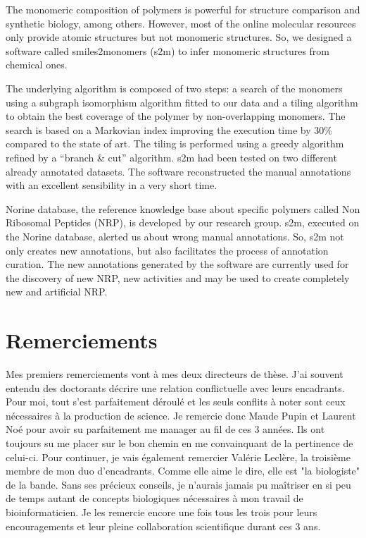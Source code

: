 \documentclass[12pt]{LHSV_thesis}
\begin{document}
The monomeric composition of polymers is powerful for structure comparison and synthetic biology, among others.
However, most of the online molecular resources only provide atomic structures but not monomeric structures.
So, we designed a software called smiles2monomers (s2m) to infer monomeric structures from chemical ones.

The underlying algorithm is composed of two steps: a search of the monomers using a subgraph isomorphism algorithm fitted to our data and a tiling algorithm to obtain the best coverage of the polymer by non-overlapping monomers.
The search is based on a Markovian index improving the execution time by 30\% compared to the state of art.
The tiling is performed using a greedy algorithm refined by a ``branch \& cut'' algorithm.
s2m had been tested on two different already annotated datasets.
The software reconstructed the manual annotations with an excellent sensibility in a very short time.

Norine database, the reference knowledge base about specific polymers called Non Ribosomal Peptides (NRP), is developed by our research group.
s2m, executed on the Norine database, alerted us about wrong manual annotations.
So, s2m not only creates new annotations, but also facilitates the process of annotation curation.
The new annotations generated by the software are currently used for the discovery of new NRP, new activities and may be used to create completely new and artificial NRP.

\cleardoublepage

\section*{\Huge Remerciements}
%

Mes premiers remerciements vont à mes deux directeurs de thèse.
J'ai souvent entendu des doctorants décrire une relation conflictuelle avec leurs encadrants.
Pour moi, tout s'est parfaitement déroulé et les seuls conflits à noter sont ceux nécessaires à la production de science.
Je remercie donc Maude Pupin et Laurent Noé pour avoir su parfaitement me manager au fil de ces 3 années.
Ils ont toujours su me placer sur le bon chemin en me convainquant de la pertinence de celui-ci.
Pour continuer, je vais également remercier Valérie Leclère, la troisième membre de mon duo d'encadrants.
Comme elle aime le dire, elle est "la biologiste" de la bande.
Sans ses précieux conseils, je n'aurais jamais pu maîtriser en si peu de temps autant de concepts biologiques nécessaires à mon travail de bioinformaticien.
Je les remercie encore une fois tous les trois pour leurs encouragements et leur pleine collaboration scientifique durant ces 3 ans.
\end{document}
